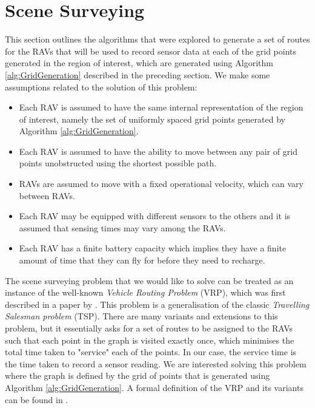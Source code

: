 
\section{Scene Surveying}\label{sec:SceneSurveying}
This section outlines the algorithms that were explored to generate a set of routes for the RAVs that will be used to record sensor data at each of the grid points generated in the region of interest, which are generated using Algorithm \ref{alg:GridGeneration} described in the preceding section. We make some assumptions related to the solution of this problem:
\begin{itemize}
    \item Each RAV is assumed to have the same internal representation of the region of interest, namely the set of uniformly spaced grid points generated by Algorithm \ref{alg:GridGeneration}.
    \item Each RAV is assumed to have the ability to move between any pair of grid points unobstructed using the shortest possible path.
    \item RAVs are assumed to move with a fixed operational velocity, which can vary between RAVs.
    \item Each RAV may be equipped with different sensors to the others and it is assumed that sensing times may vary among the RAVs.
    \item Each RAV has a finite battery capacity which implies they have a finite amount of time that they can fly for before they need to recharge.
\end{itemize}


The scene surveying problem that we would like to solve can be treated as an instance of the well-known \textit{Vehicle Routing Problem} (VRP), which was first described in a paper by \citeauthor{Dantzig1959TheProblem} \cite{Dantzig1959TheProblem}. This problem is a generalisation of the classic \textit{Travelling Salesman problem} (TSP). There are many variants and extensions to this problem, but it essentially asks for a set of routes to be assigned to the RAVs such that each point in the graph is visited exactly once, which minimises the total time taken to "service" each of the points. In our case, the service time is the time taken to record a sensor reading. We are interested solving this problem where the graph is defined by the grid of points that is generated using Algorithm \ref{alg:GridGeneration}. A formal definition of the VRP and its variants can be found in \cite{Toth2002TheProblem}.

